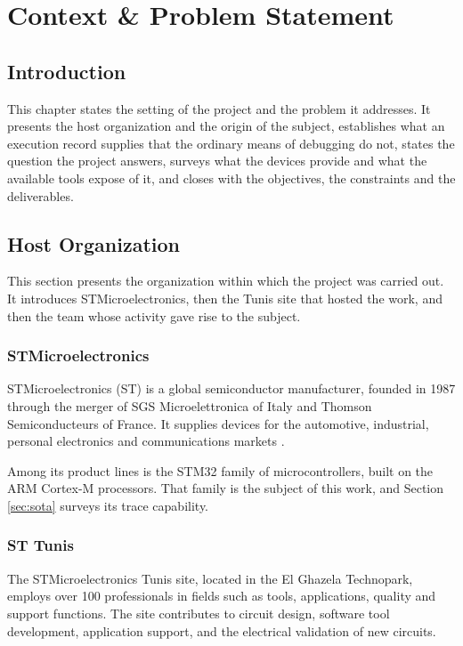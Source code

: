 \chapter{Context \& Problem Statement}

\section*{Introduction}
This chapter states the setting of the project and the problem it addresses. It presents the host organization and the origin of the subject, establishes what an execution record supplies that the ordinary means of debugging do not, states the question the project answers, surveys what the devices provide and what the available tools expose of it, and closes with the objectives, the constraints and the deliverables.

\section{Host Organization}

This section presents the organization within which the project was carried out. It introduces STMicroelectronics, then the Tunis site that hosted the work, and then the team whose activity gave rise to the subject.

\subsection{STMicroelectronics}

STMicroelectronics (ST) is a global semiconductor manufacturer, founded in 1987 through the merger of SGS Microelettronica of Italy and Thomson Semiconducteurs of France. It supplies devices for the automotive, industrial, personal electronics and communications markets \cite{st_comp}.

Among its product lines is the STM32 family of microcontrollers, built on the ARM Cortex-M processors. That family is the subject of this work, and Section \ref{sec:sota} surveys its trace capability.

\subsection{ST Tunis}

The STMicroelectronics Tunis site, located in the El Ghazela Technopark, employs over 100 professionals in fields such as tools, applications, quality and support functions. The site contributes to circuit design, software tool development, application support, and the electrical validation of new circuits.

